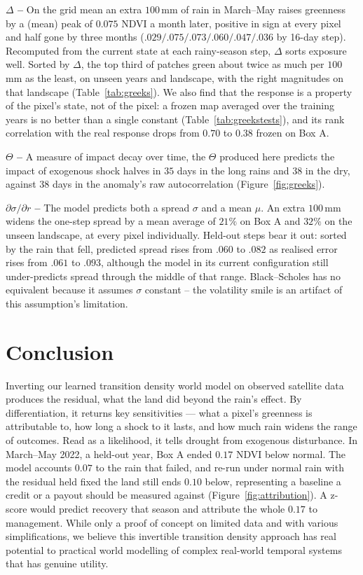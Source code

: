 \documentclass[letterpaper]{article} %
\begin{document}
\textbf{$\Delta$ -- } On the grid mean an extra $100$\,mm of rain in March--May raises greenness by a (mean) peak of $0.075$ NDVI a month later, positive in sign at every pixel and half gone by three months ($.029/.075/.073/.060/.047/.036$ by 16-day step). Recomputed from the current state at each rainy-season step, $\Delta$ sorts exposure well. Sorted by $\Delta$, the top third of patches green about twice as much per $100$\,mm as the least, on unseen years and landscape, with the right magnitudes on that landscape (Table~\ref{tab:greeks}). We also find that the response is a property of the pixel's state, not of the pixel: a frozen map averaged over the training years is no better than a single constant (Table~\ref{tab:greekstests}), and its rank correlation with the real response drops from $0.70$ to $0.38$ frozen on Box A.

\textbf{$\Theta$ -- } A measure of impact decay over time, the $\Theta$ produced here predicts the impact of exogenous shock halves in $35$ days in the long rains and $38$ in the dry, against $38$ days in the anomaly's raw autocorrelation (Figure~\ref{fig:greeks}).

\textbf{$\partial\sigma/\partial r$ -- } The model predicts both a spread $\sigma$ and a mean $\mu$. An extra $100$\,mm widens the one-step spread by a mean average of $21\%$ on Box A and $32\%$ on the unseen landscape, at every pixel individually. Held-out steps bear it out: sorted by the rain that fell, predicted spread rises from $.060$ to $.082$ as realised error rises from $.061$ to $.093$, although the model in its current configuration still under-predicts spread through the middle of that range. Black--Scholes has no equivalent because it assumes $\sigma$ constant -- the volatility smile \citep{rubinstein1994,dupire1994} is an artifact of this assumption's limitation.

\section{Conclusion}
Inverting our learned transition density world model on observed satellite data produces the residual, what the land did beyond the rain's effect. By differentiation, it returns key sensitivities --- what a pixel's greenness is attributable to, how long a shock to it lasts, and how much rain widens the range of outcomes. Read as a likelihood, it tells drought from exogenous disturbance. In March--May 2022, a held-out year, Box A ended $0.17$ NDVI below normal. The model accounts $0.07$ to the rain that failed, and re-run under normal rain with the residual held fixed the land still ends $0.10$ below, representing a baseline a credit or a payout should be measured against (Figure~\ref{fig:attribution}). A z-score would predict recovery that season and attribute the whole $0.17$ to management. While only a proof of concept on limited data and with various simplifications, we believe this invertible transition density approach has real potential to practical world modelling of complex real-world temporal systems that has genuine utility.


\end{document}
